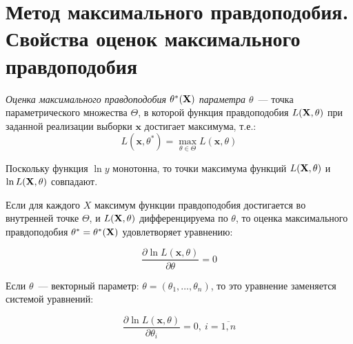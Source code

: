 \section{Метод максимального правдоподобия. Свойства оценок максимального правдоподобия}

\begin{defn}
    \textit{Оценка максимального правдоподобия $\theta^{*}(\mathbf{X})$ параметра $\theta$}~--- точка параметрического множества $\Theta$, в которой функция правдоподобия $L(\mathbf{X},\theta)$ при заданной реализации выборки $\boldsymbol{x}$ достигает максимума, т.е.:
    \begin{equation*}
        L(\boldsymbol{x}, \theta^{*})=\max\limits_{\theta \in \Theta} L(\boldsymbol{x}, \theta)
    \end{equation*}
\end{defn}

\begin{rmrk}
    Поскольку функция $\ln y$ монотонна, то точки максимума функций $L(\mathbf{X},\theta)$ и $\ln L(\mathbf{X},\theta)$ совпадают.
\end{rmrk}

Если для каждого $X$ максимум функции правдоподобия достигается во внутренней точке $\Theta$, и $L(\mathbf{X},\theta)$ дифференцируема по $\theta$, то оценка максимального правдоподобия $\theta^{*} = \theta^{*}(\mathbf{X})$ удовлетворяет уравнению:

\begin{equation*}
    \frac{\partial \ln L(\boldsymbol{x}, \theta)}{\partial \theta} = 0
\end{equation*}

Если $\theta$~--- векторный параметр: $\theta=\left(\theta_{1}, \ldots, \theta_{n}\right)$, то это уравнение заменяется системой уравнений:

\begin{equation*}
    \frac{\partial \ln L(\boldsymbol{x}, \theta)}{\partial \theta_{i}}=0,~ i=\overline{1, n} 
\end{equation*}

